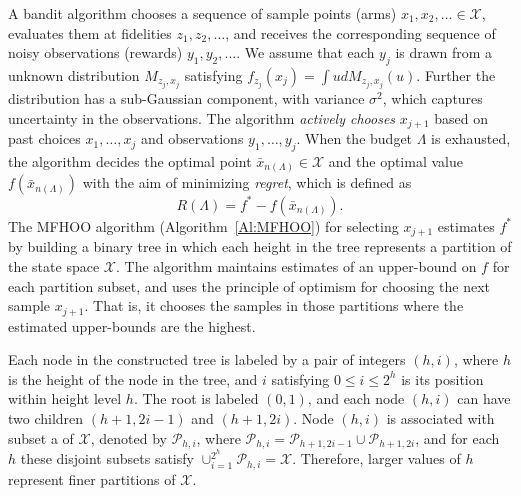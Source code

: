 \documentclass[11pt]{article}
\theoremstyle{definition}
\newcommand{\sayan}[1]{\textcolor{blue}{#1}}
\newcommand{\geir}[1]{\textcolor{red}{#1}}
\newcommand{\X}{\mathcal{X}}
\newcommand{\observ}{y}
\newcommand{\partition}[2]{{\mathcal{P}_{#1,#2}}}
\begin{document}
A bandit algorithm chooses a sequence of sample points (arms) $x_1, x_2, \ldots \in \X$, evaluates them at fidelities $z_1, z_2, \ldots$, and receives the corresponding sequence of noisy observations (rewards) $\observ_1, \observ_2, \ldots$.
%
We assume that each $\observ_j$ is drawn from a unknown distribution $M_{z_j,x_j}$ satisfying $f_{z_j}(x_j)= \int u dM_{z_j,x_j}(u)$. Further the distribution has a sub-Gaussian component, with variance $\sigma^2$, which captures uncertainty in the observations.
%
%
The algorithm {\em actively chooses\/}  $x_{j+1}$ based on past  choices $x_1, \ldots, x_j$ and observations $\observ_1, \ldots, \observ_j$. When the budget $\Lambda$ is exhausted, the algorithm decides the optimal point $\bar{x}_{n(\Lambda)} \in \X$ and the optimal value $f(\bar{x}_{n(\Lambda)})$ with the aim of minimizing  {\em  regret\/}, which is defined as
\[
R(\Lambda)=f^*-f(\bar{x}_{n(\Lambda)}).
\]
%
The MFHOO algorithm (Algorithm~\ref{Al:MFHOO}) for selecting $x_{j+1}$ estimates $f^*$ by building a binary tree in which  each height in the tree represents a partition of the state space $\X$. The algorithm maintains estimates of an upper-bound on $f$ for each partition subset, and uses the principle of optimism for choosing the next sample $x_{j+1}$. That is, it chooses the samples in those partitions where the estimated upper-bounds are the highest.

Each node in the constructed tree is labeled by a pair of integers $(h, i)$, where $h$ is the height of the node in the tree, and $i$ satisfying $0\leq i\leq 2^h$ is its position within height level $h$. The root is labeled $(0,1)$, and each
%
node  $(h,i)$ can have two children $(h+1, 2i-1)$ and $(h+1, 2i)$.
%
Node  $(h, i)$ is associated with subset a of $\X$, denoted by  $\partition{h}{i}$, where $\partition{h}{i}=\partition{h+1}{2i-1}\cup \partition{h+1}{2i}$, and for each $h$ these disjoint subsets satisfy $\cup_{i=1}^{2^h} \partition{h}{i} = \X$. Therefore, larger values of $h$ represent finer partitions of $\X$.
%
\end{document}
